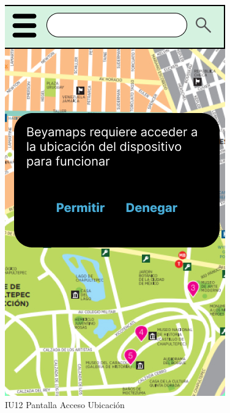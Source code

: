 \begin{figure}[h]
\begin{minipage}{0.5\textwidth}
        \includegraphics[width=.7\linewidth]{Pantallas Prototipo3/IU12 Pantalla Acceso Ubicacion.jpg}
        \caption{IU12 Pantalla Acceso Ubicación}
    \end{minipage}%
\end{figure}

